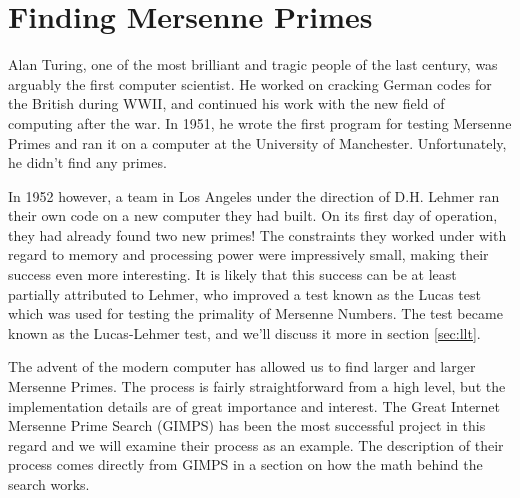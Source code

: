 \section{Finding Mersenne Primes}
\label{sec:gimp}

Alan Turing, one of the most brilliant and tragic people of the last century, was arguably the first computer scientist.  He worked on cracking German codes for the British during WWII, and continued his work with the new field of computing after the war.  In 1951, he wrote the first program for testing Mersenne Primes and ran it on a computer at the University of Manchester. Unfortunately, he didn't find any primes\cite{robinson54}. 

In 1952 however, a team in Los Angeles under the direction of D.H. Lehmer ran their own code on a new computer they had built. On its first day of operation, they had already found two new primes!  The constraints they worked under with regard to memory and processing power were impressively small, making their success even more interesting.  It is likely that this success can be at least partially attributed to Lehmer, who improved a test known as the Lucas test which was used for testing the primality of Mersenne Numbers.  The test became known as the Lucas-Lehmer test, and we'll discuss it more in section \ref{sec:llt}.

The advent of the modern computer has allowed us to find larger and larger Mersenne Primes.  The process is fairly straightforward from a high level, but the implementation details are of great importance and interest. The Great Internet Mersenne Prime Search (GIMPS) has been the most successful project in this regard and we will examine their process as an example.  The description of their process comes directly from GIMPS \cite{gimps} in a section on how the math behind the search works. 

